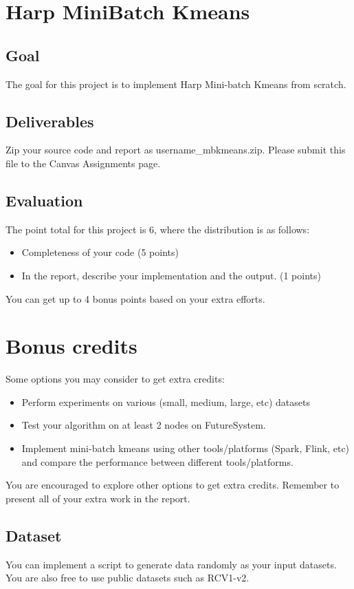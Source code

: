 \section*{Harp Mini\-Batch Kmeans}
\subsection*{Goal}
The goal for this project is to implement Harp\cite{Harp} Mini-batch Kmeans
from scratch. 

\subsection*{Deliverables}
Zip your source code and report as username\_mbkmeans.zip. Please submit this
file to the Canvas Assignments page.

\subsection*{Evaluation}

The point total for this project is 6, where the distribution is as follows:
\begin{itemize}
\item Completeness of your code (5 points)
\item In the report, describe your implementation and the output. (1 points)
\end{itemize}
 You can get up to 4 bonus points based on your  extra efforts.
\section*{Bonus credits}

Some options you may consider to get extra credits: 
\begin{itemize}
\item Perform experiments on various (small, medium, large, etc) datasets 
\item Test your algorithm on at least 2 nodes on FutureSystem.
\item Implement mini-batch kmeans using other tools/platforms
  (Spark\cite{Spark}, Flink\cite{Flink}, etc) and compare the performance
    between different tools/platforms.
\end{itemize}
You are encouraged to explore other options to get extra credits. Remember to
present all of your extra work in the report.
 
\subsection*{Dataset}
You can implement a script to  generate data randomly as your input datasets.
You are also free to use public datasets such as RCV1-v2\cite{RCV1-v2}.
  
